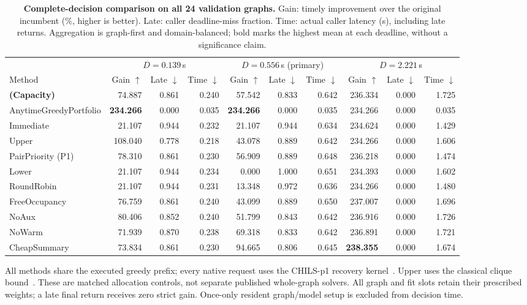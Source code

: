 \begin{table}[t]
\centering
\caption{\textbf{Complete-decision comparison on all 24 validation graphs.}
Gain: timely improvement over the original incumbent (\%, higher is better).
Late: caller deadline-miss fraction. Time: actual caller latency (s), including
late returns. Aggregation is graph-first and domain-balanced; bold marks the
highest mean at each deadline, without a significance claim.}
\label{tab:main-runtime-ablation}
\footnotesize
\setlength{\tabcolsep}{4pt}
\begin{tabular}{@{}lrrrrrrrrr@{}}
\toprule
& \multicolumn{3}{c}{$D=0.139$\,s} & \multicolumn{3}{c}{$D=0.556$\,s (primary)} & \multicolumn{3}{c}{$D=2.221$\,s} \\
\cmidrule(lr){2-4}\cmidrule(lr){5-7}\cmidrule(lr){8-10}
Method & Gain $\uparrow$ & Late $\downarrow$ & Time $\downarrow$ & Gain $\uparrow$ & Late $\downarrow$ & Time $\downarrow$ & Gain $\uparrow$ & Late $\downarrow$ & Time $\downarrow$ \\
\midrule
\textbf{\method{} (Capacity)} & 74.887 & 0.861 & 0.240 & 57.542 & 0.833 & 0.642 & 236.334 & 0.000 & 1.725 \\
\midrule
AnytimeGreedyPortfolio & \textbf{234.266} & 0.000 & 0.035 & \textbf{234.266} & 0.000 & 0.035 & 234.266 & 0.000 & 0.035 \\
Immediate & 21.107 & 0.944 & 0.232 & 21.107 & 0.944 & 0.634 & 234.624 & 0.000 & 1.429 \\
Upper & 108.040 & 0.778 & 0.218 & 43.078 & 0.889 & 0.642 & 234.266 & 0.000 & 1.606 \\
PairPriority (P1) & 78.310 & 0.861 & 0.230 & 56.909 & 0.889 & 0.648 & 236.218 & 0.000 & 1.474 \\
Lower & 21.107 & 0.944 & 0.234 & 0.000 & 1.000 & 0.651 & 234.393 & 0.000 & 1.602 \\
RoundRobin & 21.107 & 0.944 & 0.231 & 13.348 & 0.972 & 0.636 & 234.266 & 0.000 & 1.480 \\
\midrule
FreeOccupancy & 76.759 & 0.861 & 0.240 & 43.099 & 0.889 & 0.650 & 237.007 & 0.000 & 1.696 \\
NoAux & 80.406 & 0.852 & 0.240 & 51.799 & 0.843 & 0.642 & 236.916 & 0.000 & 1.726 \\
NoWarm & 71.939 & 0.870 & 0.238 & 69.318 & 0.833 & 0.642 & 236.891 & 0.000 & 1.721 \\
CheapSummary & 73.834 & 0.861 & 0.230 & 94.665 & 0.806 & 0.645 & \textbf{238.355} & 0.000 & 1.674 \\
\bottomrule
\end{tabular}
\par\smallskip
\begin{minipage}{\textwidth}
\footnotesize
All methods share the executed greedy prefix; every native request uses
the CHILS-p1 recovery kernel~\cite{grossmann2025chils}. Upper uses the classical clique
bound~\cite{chvatal1975polytopes}. These are matched allocation controls,
not separate published whole-graph solvers. All graph and fit slots retain
their prescribed weights; a late final return receives zero strict gain.
Once-only resident graph/model setup is excluded from decision time.
\end{minipage}
\end{table}
